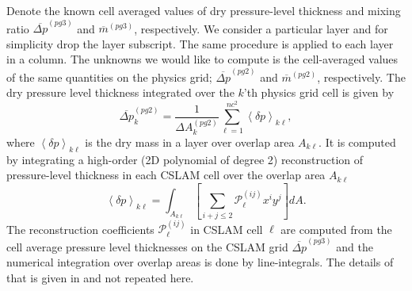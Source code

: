Denote the known cell averaged values of dry pressure-level thickness and mixing ratio $\overline{\Delta p}^{(pg3)}$ and $\overline{m}^{(pg3)}$, respectively. We consider a particular layer and for simplicity drop the layer subscript. The same procedure is applied to each layer in a column. The unknowns we would like to compute is the cell-averaged values of the same quantities on the physics grid; $\overline{\Delta p}^{(pg2)}$ and $\overline{m}^{(pg2)}$, respectively. The dry pressure level thickness integrated over the $k$'th physics grid cell is given by
\begin{equation}
\label{eq:p}
\overline{\Delta p}^{(pg2)}_k=\frac{1}{\Delta A^{(pg2)}_k}\sum_{\ell=1}^{nc^2}\left<\delta p\right>_{k\ell},
\end{equation}
where $\left< \delta p\right>_{k\ell}$ is the dry mass in a layer over overlap area $A_{k\ell}$. It is computed by integrating a high-order (2D polynomial of degree 2) reconstruction of pressure-level thickness in each CSLAM cell over the overlap area $A_{k\ell}$
\begin{equation}
\label{eq:pg3dp}
\left< \delta p\right>_{k\ell}=\int_{A_{k\ell}}\left[ \sum_{i+j\le 2}{\mathcal{P}}^{(ij)}_\ell x^{i}y^{j}\right] dA.
\end{equation}
The reconstruction coefficients ${\mathcal{P}}^{(ij)}_\ell$ in CSLAM cell $\ell$ are computed from the cell average pressure level thicknesses on the CSLAM grid $\overline{\Delta p}^{(pg3)}$ and the numerical integration over overlap areas is done by line-integrals. The details of that is given in \cite{LNU2010JCP} and not repeated here.

